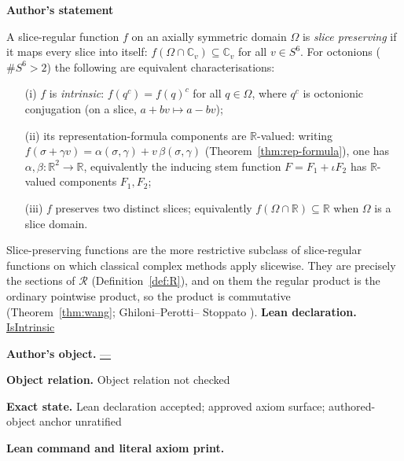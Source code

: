 \documentclass[11pt]{article}
\newcommand{\CC}{\mathbb{C}}
\newcommand{\RR}{\mathbb{R}}
\theoremstyle{plain}
\theoremstyle{definition}
\theoremstyle{remark}
\begin{document}
\medskip
\begin{tcolorbox}[provenancecard,title={16. Definition - Slice-preserving functions; \textbackslash{}protect\{\textbackslash{}cite[Def.\textasciitilde{}2.7, Rem.\textasciitilde{}2.8]\{AdF\}; \textbackslash{}cite\{VS,SeriesExp,Wang\}\}},title after break={16. Definition - Slice-preserving functions; \textbackslash{}protect\{\textbackslash{}cite[Def.\textasciitilde{}2.7, Rem.\textasciitilde{}2.8]\{AdF\}; \textbackslash{}cite\{VS,SeriesExp,Wang\}\} (continued)}]
\textbf{Author's statement}\par
A slice-regular function $f$ on an axially symmetric domain $\Omega$ is \emph{slice
preserving} if it maps every slice into itself: $f(\Omega\cap\CC_v)\subseteq\CC_v$ for all
$v\in S^6$. For octonions ($\#S^6>2$) the following are equivalent characterisations:
\begin{enumerate}[leftmargin=2.4em]
\item[(i)] $f$ is \emph{intrinsic}: $f(q^{c})=f(q)^{c}$ for all $q\in\Omega$, where $q^{c}$
  is octonionic conjugation (on a slice, $a+bv\mapsto a-bv$);
\item[(ii)] its representation-formula components are $\RR$-valued: writing
  $f(\sigma+\gamma v)=\alpha(\sigma,\gamma)+v\,\beta(\sigma,\gamma)$
  (Theorem~\ref{thm:rep-formula}), one has $\alpha,\beta:\RR^2\to\RR$, equivalently the
  inducing stem function $F=F_1+\iota F_2$ has $\RR$-valued components $F_1,F_2$;
\item[(iii)] $f$ preserves two distinct slices; equivalently $f(\Omega\cap\RR)\subseteq\RR$
  when $\Omega$ is a slice domain.
\end{enumerate}
Slice-preserving functions are the more restrictive subclass of slice-regular functions on
which classical complex methods apply slicewise. They are precisely the sections of
$\mathcal R$ (Definition~\ref{def:R}), and on them the regular product is the ordinary
pointwise product, so the product is commutative (Theorem~\ref{thm:wang}; Ghiloni--Perotti--
Stoppato \cite[Rem.~1.8]{SeriesExp}).
\tcblower
\textbf{Lean declaration.} \url{IsIntrinsic}
\par\textbf{Author's object.} \url{—}
\par\textbf{Object relation.} Object relation not checked
\par\textbf{Exact state.} Lean declaration accepted; approved axiom surface; authored-object anchor unratified
\par\smallskip\textbf{Lean command and literal axiom print.}
\begin{Verbatim}[breaklines=true,breakanywhere=true,fontsize=\small]

\end{Verbatim}
\end{tcolorbox}
\end{document}
